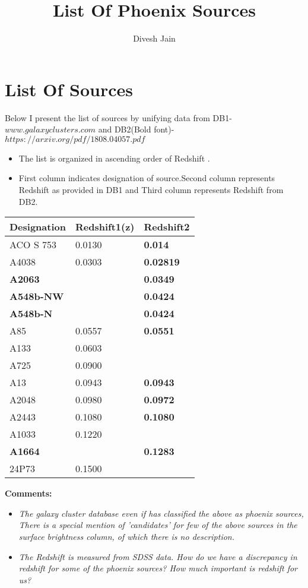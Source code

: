 \documentclass[12pt]{article}
\newcommand{\tbf}[1]{\textbf{#1}}
\newcommand{\tit}[1]{\textit{#1}}
\begin{document}
\title{List Of Phoenix Sources}
\author{Divesh Jain}
\maketitle
\newpage
\section{List Of Sources}
Below I present the list of sources by unifying data from DB1-$www.galaxyclusters.com$ and DB2(Bold font)-$https://arxiv.org/pdf/1808.04057.pdf
$
\begin{itemize}
\item The list is organized in ascending order of Redshift .\\
\item First column indicates designation of source.Second column represents Redshift as provided in DB1  and Third column represents Redshift from DB2.
\end{itemize}

\begin{center}
\begin{tabular}{|p{4cm}|p{4cm}|p{4cm}|}
\hline 
\tbf{Designation} & Redshift1(z) & Redshift2\\
\hline
ACO S 753 & 0.0130 & \tbf{0.014}\\
A4038 & 0.0303 & \tbf{0.02819}\\
\tbf{A2063}&&\tbf{0.0349}\\
\tbf{A548b-NW} &&\tbf{0.0424}\\
\tbf{A548b-N} &&\tbf{0.0424}\\
A85& 0.0557 & \tbf{0.0551}\\
A133 & 0.0603\\
A725 & 0.0900\\
A13 & 0.0943 & \tbf{0.0943}\\
A2048 &0.0980& \tbf{0.0972}\\
A2443 & 0.1080 & \tbf{0.1080}\\
A1033 & 0.1220\\
\tbf{A1664} & &\tbf{0.1283}\\
24P73 & 0.1500\\
\hline
\end{tabular}
\end{center}
\tbf{Comments:}
\begin{itemize}
\item \tit{The galaxy cluster database even if has classified the above as phoenix sources, There is a special mention of 'candidates' for few of the above sources in the surface brightness column, of which there is no description.}\\
\item \tit{ The Redshift is measured from SDSS data. How do we have a discrepancy in redshift for some of the phoenix sources? How much important is redshift for us?}
\end{itemize}
\end{document}
